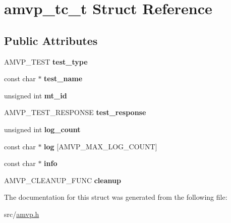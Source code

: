 \hypertarget{structamvp__tc__t}{\section{amvp\-\_\-tc\-\_\-t Struct Reference}
\label{structamvp__tc__t}
}
\subsection*{Public Attributes}
\begin{DoxyCompactItemize}
\item 
\hypertarget{structamvp__tc__t_a4c45dbed098aa66fa67689278e534567}{A\-M\-V\-P\-\_\-\-T\-E\-S\-T {\bfseries test\-\_\-type}}\label{structamvp__tc__t_a4c45dbed098aa66fa67689278e534567}

\item 
\hypertarget{structamvp__tc__t_ab2788529311ebaf9086f2e87c38e48ab}{const char $\ast$ {\bfseries test\-\_\-name}}\label{structamvp__tc__t_ab2788529311ebaf9086f2e87c38e48ab}

\item 
\hypertarget{structamvp__tc__t_a49885f2f95b8420802bb3b526bf441fe}{unsigned int {\bfseries mt\-\_\-id}}\label{structamvp__tc__t_a49885f2f95b8420802bb3b526bf441fe}

\item 
\hypertarget{structamvp__tc__t_a9c6ec72c6bdf55942867cf13cd70e881}{A\-M\-V\-P\-\_\-\-T\-E\-S\-T\-\_\-\-R\-E\-S\-P\-O\-N\-S\-E {\bfseries test\-\_\-response}}\label{structamvp__tc__t_a9c6ec72c6bdf55942867cf13cd70e881}

\item 
\hypertarget{structamvp__tc__t_a2f707b4f4880ff491a7b18c2a4ba318e}{unsigned int {\bfseries log\-\_\-count}}\label{structamvp__tc__t_a2f707b4f4880ff491a7b18c2a4ba318e}

\item 
\hypertarget{structamvp__tc__t_a2c57ae6799543ba3f75d433b4c9af855}{const char $\ast$ {\bfseries log} \mbox{[}A\-M\-V\-P\-\_\-\-M\-A\-X\-\_\-\-L\-O\-G\-\_\-\-C\-O\-U\-N\-T\mbox{]}}\label{structamvp__tc__t_a2c57ae6799543ba3f75d433b4c9af855}

\item 
\hypertarget{structamvp__tc__t_ad50fa483f02a3cc71d3ebbd25e96208f}{const char $\ast$ {\bfseries info}}\label{structamvp__tc__t_ad50fa483f02a3cc71d3ebbd25e96208f}

\item 
\hypertarget{structamvp__tc__t_a47140dc9789f54432a209d499296b31e}{A\-M\-V\-P\-\_\-\-C\-L\-E\-A\-N\-U\-P\-\_\-\-F\-U\-N\-C {\bfseries cleanup}}\label{structamvp__tc__t_a47140dc9789f54432a209d499296b31e}

\end{DoxyCompactItemize}


The documentation for this struct was generated from the following file\-:\begin{DoxyCompactItemize}
\item 
src/\hyperlink{amvp_8h}{amvp.\-h}\end{DoxyCompactItemize}
